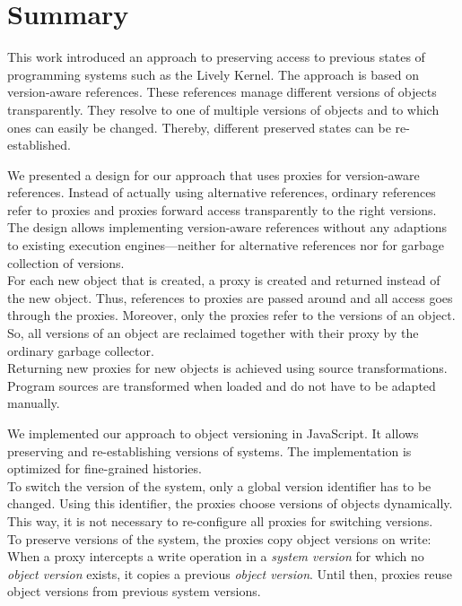 \chapter{Summary} \label{chapter:SUMMARY}

This work introduced an approach to preserving access to previous states of programming systems such as the Lively Kernel.
The approach is based on version-aware references.
These references manage different versions of objects transparently.
They resolve to one of multiple versions of objects and to which ones can easily be changed.
Thereby, different preserved states can be re-established.

We presented a design for our approach that uses proxies for version-aware references.
Instead of actually using alternative references, ordinary references refer to proxies and proxies forward access transparently to the right versions.
The design allows implementing version-aware references without any adaptions to existing execution engines---neither for alternative references nor for garbage collection of versions.\\
For each new object that is created, a proxy is created and returned instead of the new object.
Thus, references to proxies are passed around and all access goes through the proxies.
Moreover, only the proxies refer to the versions of an object.
So, all versions of an object are reclaimed together with their proxy by the ordinary garbage collector.\\
Returning new proxies for new objects is achieved using source transformations.
Program sources are transformed when loaded and do not have to be adapted manually.

We implemented our approach to object versioning in JavaScript.
It allows preserving and re-establishing versions of systems.
The implementation is optimized for fine-grained histories.\\
To switch the version of the system, only a global version identifier has to be changed.
Using this identifier, the proxies choose versions of objects dynamically.
This way, it is not necessary to re-configure all proxies for switching versions.\\
To preserve versions of the system, the proxies copy object versions on write: When a proxy intercepts a write operation in a \emph{system version} for which no \emph{object version} exists, it copies a previous \emph{object version}.
Until then, proxies reuse object versions from previous system versions.

